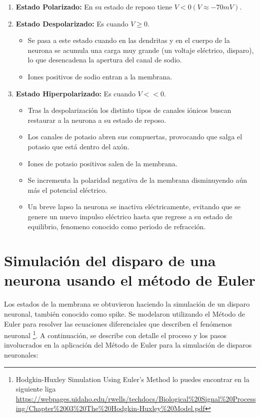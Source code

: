 \begin{enumerate}
 \item \textbf{Estado Polarizado:} En su estado de reposo tiene \(V < 0 ( V \approx -70 mV )\).
 \item \textbf{Estado Despolarizado:} Es cuando \(V \geq 0\).
 \begin{itemize}
  \item Se pasa a este estado cuando en las dendritas y en el cuerpo de la neurona se acumula una carga muy grande (un voltaje eléctrico, disparo), lo que desencadena la apertura del canal de sodio. 
  \item Iones positivos de sodio entran a la membrana. 
 \end{itemize}
 \item \textbf{Estado Hiperpolarizado:} Es cuando \(V << 0\).

  \begin{itemize}
    \item Tras la despolarización los distinto tipos de canales iónicos buscan restaurar a la neurona a su estado de reposo.
    \item Los canales de potasio abren sus compuertas, provocando que salga el potasio que está dentro del axón. 
    \item Iones de potasio positivos salen de la membrana.
    \item Se incrementa la polaridad negativa de la membrana disminuyendo aún más el potencial eléctrico.
    \item Un breve lapso la neurona se inactiva eléctricamente, evitando que se genere un nuevo impulso eléctrico hasta que regrese a su estado de equilibrio, fenomeno conocido como
    periodo de refracción.
 \end{itemize}

\end{enumerate}
 
\section{Simulación del disparo de una neurona usando el método de Euler}

Los estados de la membrana se obtuvieron haciendo la simulación de un disparo neuronal, también conocido como spike. Se modelaron utilizando el Método de Euler para resolver las ecuaciones diferenciales que describen el fenómenos neuronal \footnote{Hodgkin-Huxley Simulation Using Euler's Method lo puedes encontrar en la siguiente liga \url{https://webpages.uidaho.edu/rwells/techdocs/Biological\%20Signal\%20Processing/Chapter\%2003\%20The\%20Hodgkin-Huxley\%20Model.pdf}}. A continuación, se describe con detalle el proceso y los pasos involucrados en la aplicación del Método de Euler para la simulación de disparos neuronales:

